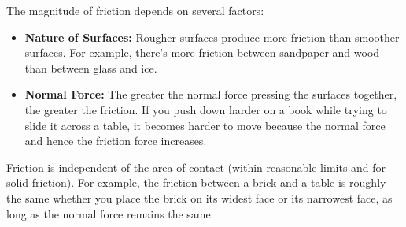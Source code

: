 The magnitude of friction depends on several factors:

\begin{itemize}
    \item \textbf{Nature of Surfaces:}  Rougher surfaces produce more friction than smoother surfaces.  For example, there's more friction between sandpaper and wood than between glass and ice.
    \item \textbf{Normal Force:} The greater the normal force pressing the surfaces together, the greater the friction.  If you push down harder on a book while trying to slide it across a table, it becomes harder to move because the normal force and hence the friction force increases.
\end{itemize}

Friction is independent of the area of contact (within reasonable limits and for solid friction).  For example, the friction between a brick and a table is roughly the same whether you place the brick on its widest face or its narrowest face, as long as the normal force remains the same.

